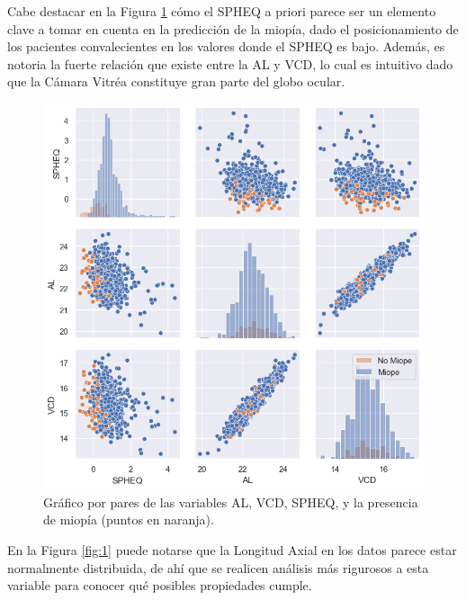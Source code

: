 \documentclass[a4paper,10pt,twocolumn]{article}
\begin{document}
	Cabe destacar en la Figura \ref{fig:4} cómo el SPHEQ a priori parece ser un elemento clave a tomar en cuenta en la predicción de la miopía, dado el posicionamiento de los pacientes convalecientes en los valores donde el SPHEQ es bajo. Además, es notoria la fuerte relación que existe entre  la AL y VCD, lo cual es intuitivo dado que la Cámara Vitréa constituye gran parte del globo ocular.
	
		\begin{figure}[ht]%
		\begin{center}
			\centering
			\includegraphics[height = .75\linewidth, width=.8\linewidth]{assets/focused_pairplot}
		\end{center}
		\caption{Gráfico por pares de las variables AL, VCD, SPHEQ, y la presencia de miopía (puntos en naranja).}
		\label{fig:4}
	\end{figure}
	 
	 En  la Figura \ref{fig:1} puede notarse que la Longitud Axial en los datos parece estar normalmente distribuida, de ahí que se realicen análisis más rigurosos a esta variable para conocer qué posibles propiedades cumple.
\end{document}
